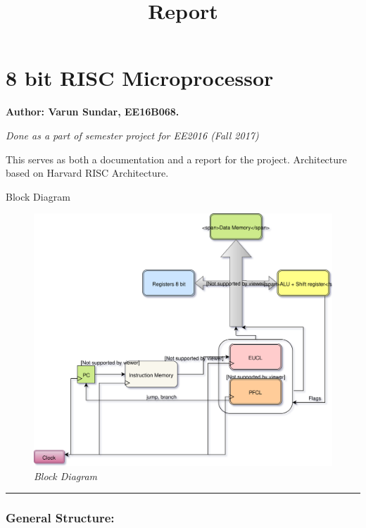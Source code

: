 \documentclass[11pt]{article}
\title{Report}
\makeatletter
\def\maxwidth{\ifdim\Gin@nat@width>\linewidth\linewidth
    \else\Gin@nat@width\fi}
\let\Oldincludegraphics\includegraphics
\renewcommand{\includegraphics}[1]{\Oldincludegraphics[width=.8\maxwidth]{#1}}
\makeatother
\begin{document}
    
    
    \maketitle
    
    

    
    \section{8 bit RISC Microprocessor}\label{bit-risc-microprocessor}

\textbf{Author: Varun Sundar, EE16B068.}

\emph{Done as a part of semester project for EE2016 (Fall 2017)}

This serves as both a documentation and a report for the project.
Architecture based on Harvard RISC Architecture.

Block Diagram

\begin{figure}
\centering
\includegraphics{./Block_diag_8_bit.svg}
\caption{\emph{Block Diagram}}
\end{figure}

\begin{center}\rule{0.5\linewidth}{\linethickness}\end{center}

\subsubsection{General Structure:}\label{general-structure}
\end{document}
